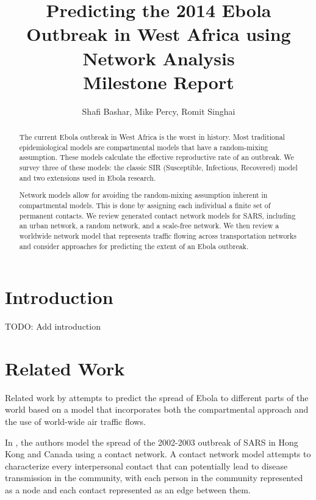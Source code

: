 \documentclass[10pt, journal,onecolumn]{IEEEtran}
\title{Predicting the 2014 Ebola Outbreak in West Africa using Network Analysis \\
       {\large Milestone Report} }
\author{Shafi Bashar, Mike Percy, Romit  Singhai}
\affil{\textit {\{shafiab, mp81, romit\}@stanford.edu}}
\begin{document}
\maketitle

\begin{abstract}
The current Ebola outbreak in West Africa is the worst in history.
Most traditional epidemiological models are compartmental models that have a random-mixing
assumption. These models calculate the
effective reproductive rate of an outbreak. We survey three of these models: the classic
SIR (Susceptible, Infectious, Recovered) model and two extensions used in Ebola research.

Network models allow for avoiding the random-mixing
assumption inherent in compartmental models.
This is done by assigning each individual a finite set of permanent contacts.
We review generated contact network models for SARS, including an urban network, a random network, and
a scale-free network.
We then review a worldwide network model that represents traffic flowing across transportation
networks and consider approaches for predicting the extent of an Ebola outbreak.

\end{abstract}




\section{Introduction}
\label{sec:Introduction}

TODO: Add introduction

\section{Related Work}
\label{sec:RelatedWork}

Related work by \citep{gomes2014assessing} attempts to predict the spread of Ebola
to different parts of the world based on a model that incorporates both the compartmental
approach and the use of world-wide air traffic flows.

In \citep{meyers2005network}, the authors model the spread of the 2002-2003
outbreak of SARS in Hong Kong and Canada using a contact network.
A contact network model attempts to characterize every interpersonal contact that can
potentially lead to disease transmission in the community, with each person in the
community represented as a node and each contact represented as an edge between them.
\end{document}
